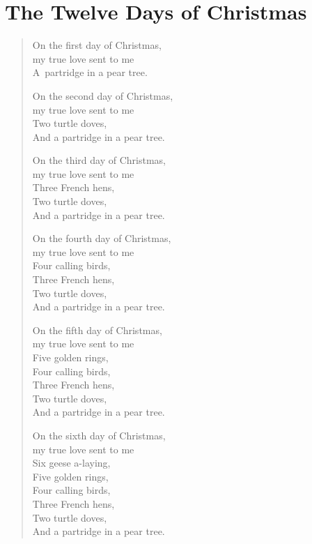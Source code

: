\section{The Twelve Days of Christmas} 

\enlargethispage{0.5cm}

\begin{verse}
On the first day of Christmas, \\
my true love sent to me \\
A~partridge in a pear tree.

\medskip

On the second day of Christmas, \\ 
my true love sent to me \\
Two turtle doves, \\
And a partridge in a pear tree. 

\medskip

On the third day of Christmas, \\
my true love sent to me \\
Three French hens, \\
Two turtle doves, \\
And a partridge in a pear tree. 

\medskip

On the fourth day of Christmas, \\
my true love sent to me \\
Four calling birds, \\
Three French hens, \\
Two turtle doves, \\
And a partridge in a pear tree.

\medskip

On the fifth day of Christmas, \\
my true love sent to me \\
Five golden rings, \\
Four calling birds, \\
Three French hens, \\
Two turtle doves, \\
And a partridge in a pear tree. 

\medskip

On the sixth day of Christmas, \\
my true love sent to me \\
Six geese a-laying, \\
Five golden rings, \\
Four calling birds, \\
Three French hens, \\
Two turtle doves, \\
And a partridge in a pear tree.


\end{verse}
